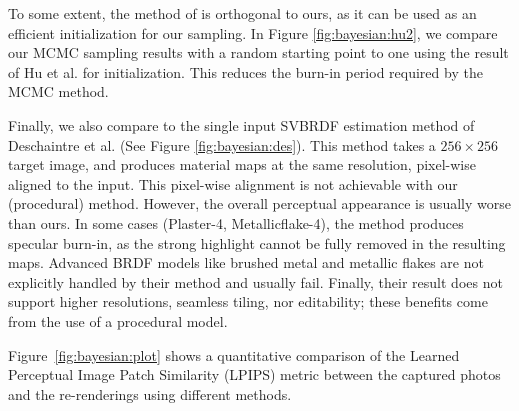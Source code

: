 

To some extent, the method of \cite{hu2019novel} is orthogonal to ours, as it can be used as an efficient initialization for our sampling. In Figure \ref{fig:bayesian:hu2}, we compare our MCMC sampling results with a random starting point to one using the result of Hu et al. for initialization. This reduces the burn-in period required by the MCMC method.



Finally, we also compare to the single input SVBRDF estimation method of Deschaintre et al. \cite{deschaintre2018single} (See Figure \ref{fig:bayesian:des}). This method takes a $256 \times 256$ target image, and produces material maps at the same resolution, pixel-wise aligned to the input. This pixel-wise alignment is not achievable with our (procedural) method. However, the overall perceptual appearance is usually worse than ours. In some cases (Plaster-4, Metallicflake-4), the method produces specular burn-in, as the strong highlight cannot be fully removed in the resulting maps. Advanced BRDF models like brushed metal and metallic flakes are not explicitly handled by their method and usually fail. Finally, their result does not support higher resolutions, seamless tiling, nor editability; these benefits come from the use of a procedural model.

Figure~\ref{fig:bayesian:plot} shows a quantitative comparison of the Learned Perceptual Image Patch Similarity (LPIPS) metric \cite{zhang2018unreasonable} between the captured photos and the re-renderings using different methods.


